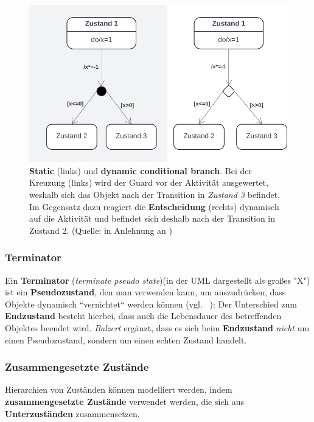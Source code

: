 \begin{figure}
    \centering
    \includegraphics[scale=0.4]{part three/Zustandsautomaten/img/kreuzungentscheidung}
    \caption{\textbf{Static} (links) und \textbf{dynamic conditional branch}. Bei der Kreuzung (links) wird der Guard vor der Aktivität ausgewertet, weshalb sich das Objekt nach der Transition in \textit{Zustand 3} befindet. Im Gegensatz dazu reagiert die \textbf{Entscheidung} (rechts) dynamisch auf die Aktivität und befindet sich deshalb nach der Transition in Zustand 2. (Quelle: in Anlehnung an \cite[72, Abb. 7.7, Abb. 7.8]{Buh09})}
    \label{fig:kreuzungentscheidung}
\end{figure}


\subsubsection*{Terminator}
Ein \textbf{Terminator} (\textit{terminate pseudo state})(in der UML dargestellt als großes "X") ist ein \textbf{Pseudozustand}, den man verwenden kann, um auszudrücken, dass Objekte dynamisch ``vernichtet`` werden können (vgl. ~\cite[341]{Bal05}): Der Unterschied zum \textbf{Endzustand} besteht hierbei, dass auch die Lebensdauer des betreffenden Objektes beendet wird. \textit{Balzert} ergänzt, dass es sich beim \textbf{Endzustand} \textit{nicht} um einen Pseudozustand, sondern um einen echten Zustand handelt.

\subsubsection*{Zusammengesetzte Zustände}
Hierarchien von Zuständen können modelliert werden, indem \textbf{zusammengesetzte Zustände} verwendet werden, die sich aus \textbf{Unterzuständen} zusammensetzen.\\

